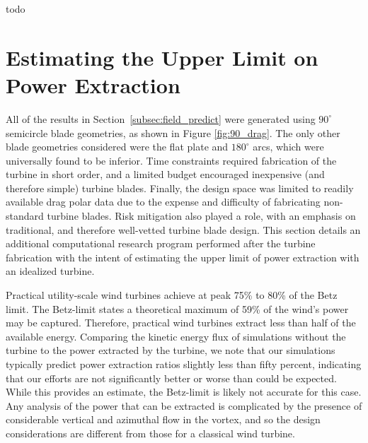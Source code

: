 todo

\section{Estimating the Upper Limit on Power Extraction}
\label{sec:peak_estimate}

All of the results in Section~\ref{subsec:field_predict} were generated
using $90^{\circ}$ semicircle blade geometries, as shown in Figure
\ref{fig:90_drag}. The only other blade geometries considered were the
flat plate and $180^{\circ}$ arcs, which were universally found to be
inferior. Time constraints required fabrication of the turbine in short
order, and a limited budget encouraged inexpensive (and therefore
simple) turbine blades. Finally, the design space was limited to
readily available drag polar data due to the expense and difficulty of 
fabricating non-standard turbine blades. Risk mitigation also played a
role, with an emphasis on traditional, and therefore well-vetted turbine
blade design. %
This section details an additional computational research program
performed after the turbine fabrication with the intent of estimating
the upper limit of power extraction with an idealized turbine. 

Practical utility-scale wind turbines achieve at peak 75\% to 80\% of
the Betz limit\cite{burton2001wind}. The Betz-limit states a theoretical
maximum of 59\% of the wind's power may be captured. Therefore,
practical wind turbines extract less than half of the available energy. 
Comparing the kinetic energy flux of simulations without the turbine to
the power extracted by the turbine, we note that our simulations
typically predict power extraction ratios slightly less than fifty
percent, indicating that our efforts are not significantly better or
worse than could be expected. While this provides an estimate, the
Betz-limit is likely not accurate for this case. Any analysis of the
power that can be extracted is complicated by the presence of
considerable vertical and azimuthal flow in the vortex, and so the
design considerations are different from those for a classical wind
turbine.  

